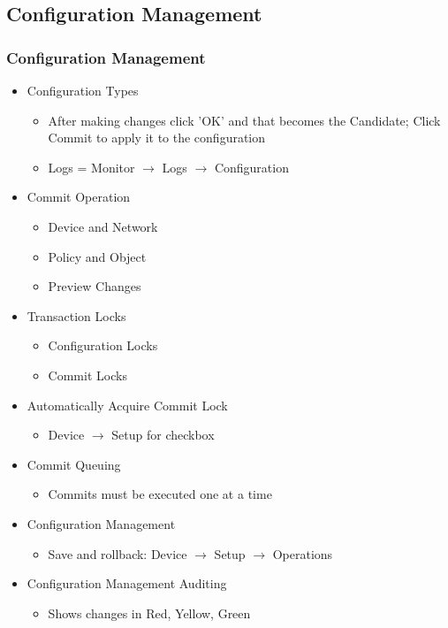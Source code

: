 \subsection{Configuration Management}
\subsubsection{Configuration Management}    
    \begin{itemize}
        \item Configuration Types
            \begin{itemize}
                \item After making changes click 'OK' and that becomes the Candidate; Click Commit to apply it to the configuration
                \item Logs = Monitor $\rightarrow$ Logs $\rightarrow$ Configuration
            \end{itemize}
        \item Commit Operation
            \begin{itemize}
                \item Device and Network
                \item Policy and Object
                \item Preview Changes
            \end{itemize}
        \item Transaction Locks
            \begin{itemize}
                \item Configuration Locks
                \item Commit Locks
            \end{itemize}
        \item Automatically Acquire Commit Lock
            \begin{itemize}
                \item Device $\rightarrow$ Setup for checkbox
            \end{itemize}
        \item Commit Queuing
            \begin{itemize}
                \item Commits must be executed one at a time
            \end{itemize}
        \item Configuration Management
            \begin{itemize}
                \item Save and rollback: Device $\rightarrow$ Setup $\rightarrow$ Operations
            \end{itemize}
        \item Configuration Management Auditing
            \begin{itemize}
                \item Shows changes in Red, Yellow, Green 
            \end{itemize}
    \end{itemize}

